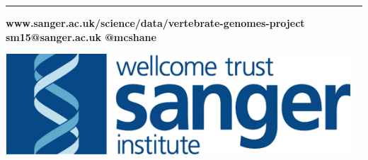 \documentclass[a0,portrait]{a0poster}
\begin{document}
\begin{center}\noindent\rule{1.0\linewidth}{0.05pt}\end{center}

\vfill

\noindent
\begin{minipage}[][][b]{0.75\textwidth}
\begin{tcolorbox}[boxsep=25pt,width=1.0\linewidth,colback=sangerlightblue3,arc=20pt]
\large{
\color{sangertext}
\textbf{www.sanger.ac.uk/science/data/vertebrate-genomes-project
\hfill
sm15@sanger.ac.uk
\hfill
@mcshane
}}
\end{tcolorbox}
\end{minipage}%
\hfill%
\begin{minipage}[][][b]{0.25\textwidth}
    \centering
    \includegraphics[height=3.75cm]{images/wtsi}
\end{minipage}%
\end{document}
